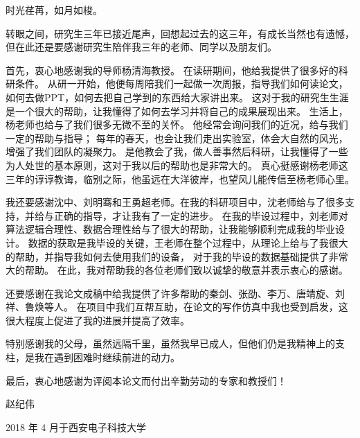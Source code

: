 
\begin{thanks}

时光荏苒，如月如梭。\par

转眼之间，研究生三年已接近尾声，回想起过去的这三年，有成长当然也有遗憾，
但在此还是要感谢研究生陪伴我三年的老师、同学以及朋友们。\par

首先，衷心地感谢我的导师杨清海教授。
在读研期间，他给我提供了很多好的科研条件。
从研一开始，他便每周陪我们一起做一次周报，指导我们如何读论文，如何去做PPT，如何去把自己学到的东西给大家讲出来。
这对于我的研究生生涯是一个很大的帮助，让我懂得了如何去学习并将自己的成果展现出来。
生活上，杨老师也给与了我们很多无微不至的关怀。
他经常会询问我们的近况，给与我们一定的帮助与指导；
每年的春天，也会让我们走出实验室，体会大自然的风光，增强了我们团队的凝聚力。
是他教会了我，做人善事然后科研，让我懂得了一些为人处世的基本原则，这对于我以后的帮助也是非常大的。
真心挺感谢杨老师这三年的谆谆教诲，临别之际，他虽远在大洋彼岸，也望风儿能传信至杨老师心里。\par

我还要感谢沈中、刘明骞和王勇超老师。在我的科研项目中，沈老师给与了很多支持，并给与正确的指导，才让我有了一定的进步。
在我的毕设过程中，刘老师对算法逻辑合理性、数据合理性给与了很大的帮助，让我能够顺利完成我的毕业设计。
数据的获取是我毕设的关键，王老师在整个过程中，从理论上给与了我很大的帮助，并指导我如何去使用我们的设备，
对于我的毕设的数据基础提供了非常大的帮助。
在此，我对帮助我的各位老师们致以诚挚的敬意并表示衷心的感谢。

还要感谢在我论文成稿中给我提供了许多帮助的秦剑、张劭、李万、唐靖旋、刘祥、鲁焕等人。
在项目中我们互帮互助，在论文的写作仿真中我也受到启发，这很大程度上促进了我的进展并提高了效率。 \par

特别感谢我的父母，虽然远隔千里，虽然我早已成人，但他们仍是我精神上的支柱，是我在遇到困难时继续前进的动力。\par

最后，衷心地感谢为评阅本论文而付出辛勤劳动的专家和教授们！ \par

赵纪伟\par

2018 年 4 月于西安电子科技大学\par

\end{thanks}
